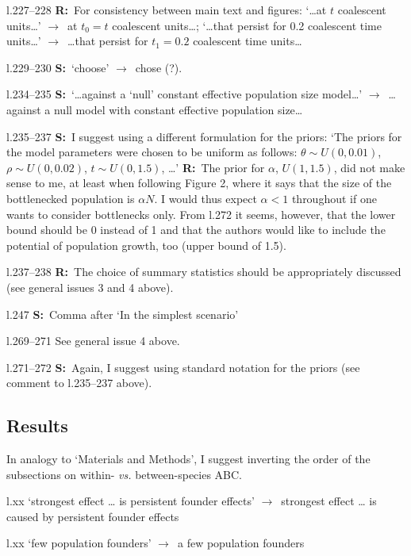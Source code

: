 \documentclass[11pt]{article}
\newenvironment{my_description}
{\begin{description}
  \setlength{\itemsep}{2pt}
  \setlength{\parskip}{0pt}
  \setlength{\parsep}{0pt}}
{\end{description}}
\newcommand{\ra}{$\rightarrow$\ }
\newcommand{\R}{\textbf{R:}\ }
\newcommand{\V}{\textbf{S:}\ }
\begin{document}
\begin{my_description}
	\item[l.227--228] \R For consistency between main text and figures: `\dots at $t$ coalescent units\dots' \ra at $t_0 = t$ coalescent units\dots; `\dots that persist for 0.2 coalescent time units\dots' \ra \dots that persist for $t_1 = 0.2$ coalescent time units\dots
	\item[l.229--230] \V `choose' \ra chose (?).
	\item[l.234--235] \V `\dots against a `null' constant effective population size model\dots' \ra \dots against a null model with constant effective population size\dots
	\item[l.235--237] \V I suggest using a different formulation for the priors: `The priors for the model parameters were chosen to be uniform as follows: $\theta \sim U(0, 0.01)$, $\rho \sim U(0, 0.02)$, $t \sim U(0, 1.5)$, \dots' \R The prior for $\alpha$,  $U(1,1.5)$, did not make sense to me, at least when following Figure 2, where it says that the size of the bottlenecked population is $\alpha N$. I would thus expect $\alpha < 1$ throughout if one wants to consider bottlenecks only. From l.272 it seems, however, that the lower bound should be 0 instead of 1 and that the authors would like to include the potential of population growth, too (upper bound of 1.5).
	\item[l.237--238] \R The choice of summary statistics should be appropriately discussed (see general issues 3 and 4 above).
	\item[l.247] \V Comma after `In the simplest scenario'
	\item[l.269--271] See general issue 4 above.
	\item[l.271--272] \V Again, I suggest using standard notation for the priors (see comment to l.235--237 above).
\end{my_description}


\subsection{Results}
In analogy to `Materials and Methods', I suggest inverting the order of the subsections on within- \emph{vs.} between-species ABC.
\begin{my_description}
	\item[l.xx] `strongest effect \ldots{} is persistent founder effects' \ra strongest effect \ldots{} is caused by persistent founder effects
	\item[l.xx] `few population founders' \ra a few population founders
\end{my_description}
\end{document}
